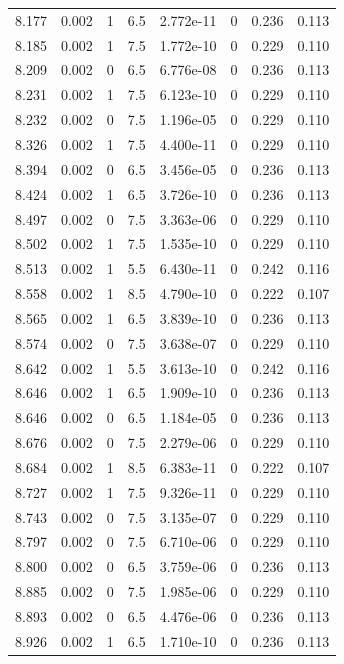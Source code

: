 \documentclass[preview]{standalone}
\begin{document}
{{{{{{{\begin{tabular}{L{1.2cm}C{1.2cm} C{0.3cm}C{0.5cm} C{1.4cm}C{1.4cm} C{1.4cm}C{1.4cm}}
  8.177  &  0.002  & 1     & 6.5 &  2.772e-11  & 0  & 0.236 &  0.113   \\ 
  8.185  &  0.002  & 1     & 7.5 &  1.772e-10  & 0  & 0.229 &  0.110   \\ 
  8.209  &  0.002  & 0     & 6.5 &  6.776e-08  & 0  & 0.236 &  0.113   \\ 
  8.231  &  0.002  & 1     & 7.5 &  6.123e-10  & 0  & 0.229 &  0.110   \\ 
  8.232  &  0.002  & 0     & 7.5 &  1.196e-05  & 0  & 0.229 &  0.110   \\ 
  8.326  &  0.002  & 1     & 7.5 &  4.400e-11  & 0  & 0.229 &  0.110   \\ 
  8.394  &  0.002  & 0     & 6.5 &  3.456e-05  & 0  & 0.236 &  0.113   \\ 
  8.424  &  0.002  & 1     & 6.5 &  3.726e-10  & 0  & 0.236 &  0.113   \\ 
  8.497  &  0.002  & 0     & 7.5 &  3.363e-06  & 0  & 0.229 &  0.110   \\ 
  8.502  &  0.002  & 1     & 7.5 &  1.535e-10  & 0  & 0.229 &  0.110   \\ 
  8.513  &  0.002  & 1     & 5.5 &  6.430e-11  & 0  & 0.242 &  0.116   \\ 
  8.558  &  0.002  & 1     & 8.5 &  4.790e-10  & 0  & 0.222 &  0.107   \\ 
  8.565  &  0.002  & 1     & 6.5 &  3.839e-10  & 0  & 0.236 &  0.113   \\ 
  8.574  &  0.002  & 0     & 7.5 &  3.638e-07  & 0  & 0.229 &  0.110   \\ 
  8.642  &  0.002  & 1     & 5.5 &  3.613e-10  & 0  & 0.242 &  0.116   \\ 
  8.646  &  0.002  & 1     & 6.5 &  1.909e-10  & 0  & 0.236 &  0.113   \\ 
  8.646  &  0.002  & 0     & 6.5 &  1.184e-05  & 0  & 0.236 &  0.113   \\ 
  8.676  &  0.002  & 0     & 7.5 &  2.279e-06  & 0  & 0.229 &  0.110   \\ 
  8.684  &  0.002  & 1     & 8.5 &  6.383e-11  & 0  & 0.222 &  0.107   \\ 
  8.727  &  0.002  & 1     & 7.5 &  9.326e-11  & 0  & 0.229 &  0.110   \\ 
  8.743  &  0.002  & 0     & 7.5 &  3.135e-07  & 0  & 0.229 &  0.110   \\ 
  8.797  &  0.002  & 0     & 7.5 &  6.710e-06  & 0  & 0.229 &  0.110   \\ 
  8.800  &  0.002  & 0     & 6.5 &  3.759e-06  & 0  & 0.236 &  0.113   \\ 
  8.885  &  0.002  & 0     & 7.5 &  1.985e-06  & 0  & 0.229 &  0.110   \\ 
  8.893  &  0.002  & 0     & 6.5 &  4.476e-06  & 0  & 0.236 &  0.113   \\ 
  8.926  &  0.002  & 1     & 6.5 &  1.710e-10  & 0  & 0.236 &  0.113   \\ 
\hline 
\end{tabular} 

}}}}}}}
\end{document}
